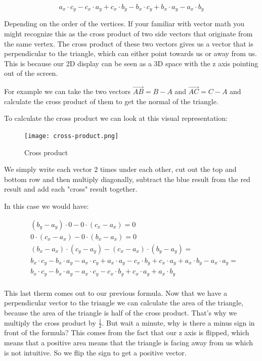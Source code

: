 \documentclass[12pt]{report} \usepackage{preamble}
\begin{document}
\[a_x \cdot c_y - c_x \cdot a_y + c_x \cdot b_y - b_x \cdot c_y + b_x \cdot a_y - a_x \cdot b_y\]

Depending on the order of the vertices. If your familiar with vector math you might
recognize this as the cross product of two side vectors that originate from the same vertex.
The cross product of these two vectors gives us a vector that is perpendicular to the triangle,
which can either point towards us or away from us.
This is because our 2D display can be seen as a 3D space with the z axis pointing out of the screen.

For example we can take the two vectors \(\vec{AB} = B - A\) and \(\vec{AC} = C - A\)
and calculate the cross product of them to get the normal of the triangle.

To calculate the cross product we can look at this visual representation:

\begin{figure}[hbtp]
	\centering
	\texttt{[image: cross-product.png]}
	\caption{Cross product} \Floatbarrier
\end{figure}

We simply write each vector 2 times under each other, cut out the top and bottom row
and then multiply diagonally, subtract the blue result from the red result
and add each "cross" result together.

In this case we would have:

\[
	\begin{aligned}
		 & (b_y - a_y) \cdot 0 - 0 \cdot (c_x - a_x) = 0                                                                                    \\
		 & 0 \cdot (c_x - a_x) - 0 \cdot (b_x - a_x) = 0                                                                                    \\
		 & (b_x - a_x) \cdot (c_y - a_y) - (c_x - a_x) \cdot (b_y - a_y) =                                                                  \\
		 & b_x \cdot c_y - b_x \cdot a_y - a_x \cdot c_y + a_x \cdot a_y - c_x \cdot b_y + c_x \cdot a_y + a_x \cdot b_y - a_x \cdot a_y  = \\
		 & b_x \cdot c_y - b_x \cdot a_y - a_x \cdot c_y - c_x \cdot b_y + c_x \cdot a_y + a_x \cdot b_y                                    \\
	\end{aligned}
\]

This last therm comes out to our previous formula.
Now that we have a perpendicular vector to the triangle we can calculate the area of the triangle,
because the area of the triangle is half of the cross product.
That's why we multiply the cross product by \(\frac{1}{2}\).
But wait a minute, why is there a minus sign in front of the formula?
This comes from the fact that our z axis is flipped, which means that a positive area
means that the triangle is facing away from us which is not
intuitive. So we flip the sign to get a positive vector.
\end{document}
